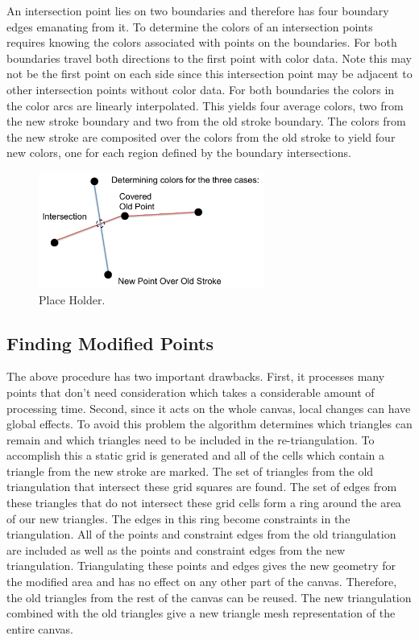 \documentclass[conference]{acmsiggraph}
\begin{document}
An intersection point lies on two boundaries and therefore has four boundary edges emanating from it. 
To determine the colors of an intersection points requires knowing the colors associated with
points on the boundaries. For both boundaries travel both directions to the first point with color data. Note this may not
be the first point on each side since this intersection point may be adjacent to other intersection
points without color data. For both boundaries the colors in the color arcs are linearly interpolated. 
This yields four average colors, two from the new stroke boundary and two from the old stroke boundary.
The colors from the new stroke are composited over the colors from the old stroke to yield four new
colors, one for each region defined by the boundary intersections. 

\begin{figure}
    \centering
        \includegraphics[height=1.5in]{images/determiningcolors}
    \caption{Place Holder.}
\end{figure}


\subsection{Finding Modified Points}
The above procedure has two important drawbacks. First, it processes many points that don't need
consideration which takes a considerable amount of processing time. Second, since it acts on the whole
canvas, local changes can have global effects. To avoid this problem the algorithm determines
which triangles can remain
and which triangles need to be included in the re-triangulation. To accomplish this a static grid
is generated and all of the cells which contain a triangle from the new stroke are marked. 
The set of triangles from the old triangulation that intersect these grid squares are found.
The set of edges from these triangles that do not intersect these grid cells form a ring
around the area of our new triangles. The edges in this ring become constraints
in the triangulation. All of the points and constraint edges from the old triangulation are
included as well as the points and constraint edges from the new triangulation. Triangulating
these points and edges gives the new geometry for the modified area and has no effect on any
other part of the canvas. Therefore, the old triangles from the rest of the canvas can be reused. 
The new triangulation combined with the old triangles give a new triangle mesh representation of the entire canvas.
\end{document}
